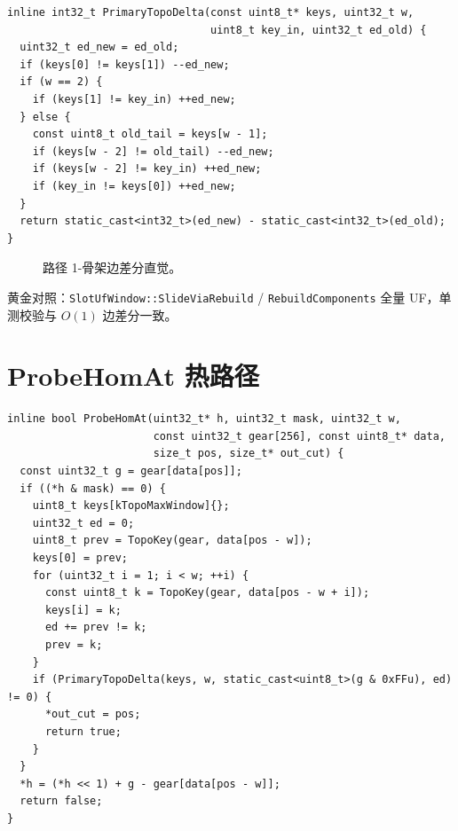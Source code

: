 \begin{lstlisting}[caption={三边差分（\filepath{topo\_hom\_scan.cc}）},label={lst:primary-topo-delta}]
inline int32_t PrimaryTopoDelta(const uint8_t* keys, uint32_t w,
                                uint8_t key_in, uint32_t ed_old) {
  uint32_t ed_new = ed_old;
  if (keys[0] != keys[1]) --ed_new;
  if (w == 2) {
    if (keys[1] != key_in) ++ed_new;
  } else {
    const uint8_t old_tail = keys[w - 1];
    if (keys[w - 2] != old_tail) --ed_new;
    if (keys[w - 2] != key_in) ++ed_new;
    if (key_in != keys[0]) ++ed_new;
  }
  return static_cast<int32_t>(ed_new) - static_cast<int32_t>(ed_old);
}
\end{lstlisting}

\begin{figure}[htbp]
\centering
{}
\caption{路径 1-骨架边差分直觉。}
\label{fig:hom-edges}
\end{figure}

黄金对照：\texttt{SlotUfWindow::SlideViaRebuild} / \texttt{RebuildComponents} 全量 UF，单测校验与 $O(1)$ 边差分一致。

\section{ProbeHomAt 热路径}

\begin{lstlisting}[caption={仅 primary 时 $O(w)$ 键化},label={lst:probe-hom}]
inline bool ProbeHomAt(uint32_t* h, uint32_t mask, uint32_t w,
                       const uint32_t gear[256], const uint8_t* data,
                       size_t pos, size_t* out_cut) {
  const uint32_t g = gear[data[pos]];
  if ((*h & mask) == 0) {
    uint8_t keys[kTopoMaxWindow]{};
    uint32_t ed = 0;
    uint8_t prev = TopoKey(gear, data[pos - w]);
    keys[0] = prev;
    for (uint32_t i = 1; i < w; ++i) {
      const uint8_t k = TopoKey(gear, data[pos - w + i]);
      keys[i] = k;
      ed += prev != k;
      prev = k;
    }
    if (PrimaryTopoDelta(keys, w, static_cast<uint8_t>(g & 0xFFu), ed) != 0) {
      *out_cut = pos;
      return true;
    }
  }
  *h = (*h << 1) + g - gear[data[pos - w]];
  return false;
}
\end{lstlisting}

